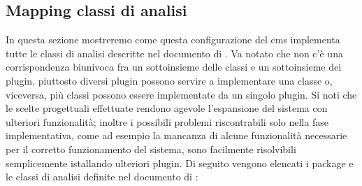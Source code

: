 \subsection{Mapping classi di analisi}
In questa sezione mostreremo come questa configurazione del \gls{cms} implementa tutte le classi di analisi descritte nel documento di . Va notato che non c'è una corrispondenza biunivoca fra un sottoinsieme delle classi e un sottoinsieme dei plugin, piuttosto diversi plugin possono servire a implementare una classe o, viceversa, più classi possono essere implementate da un singolo plugin.
Si noti che le scelte progettuali effettuate rendono agevole l'espansione del sistema con ulteriori funzionalità; inoltre i possibili problemi riscontrabili solo nella fase implementativa, come ad esempio la mancanza di alcune funzionalità necessarie per il corretto funzionamento del sistema, sono facilmente risolvibili semplicemente istallando ulteriori plugin. 
Di seguito vengono elencati i package e le classi di analisi definite nel documento di :
